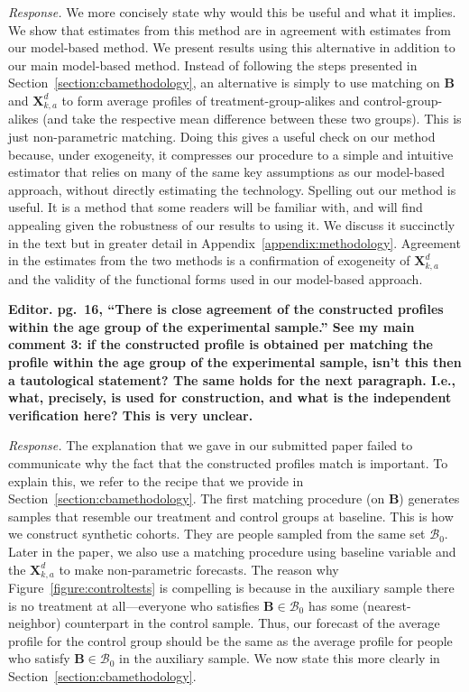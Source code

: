 \noindent \textit{Response.} We more concisely state why would this be useful and what it implies. We show that estimates from  this method are in agreement with estimates from our model-based method. We present results using this alternative in addition to our main model-based method. Instead of following the steps presented in Section~\ref{section:cbamethodology}, an alternative is simply to use matching on $\bm{B}$ and $\bm{X}^d_{k,a}$ to form average profiles of treatment-group-alikes and control-group-alikes (and take the respective mean difference between these two groups). This is just non-parametric matching. Doing this gives a useful check on our method because, under exogeneity, it compresses our procedure to a simple and intuitive estimator that relies on many of the same key assumptions as our model-based approach, without directly estimating the technology. Spelling out our method is useful. It is a method that some readers will be familiar with, and will find appealing given the robustness of our results to using it. We discuss it succinctly in the text but in greater detail in Appendix~\ref{appendix:methodology}. Agreement in the estimates from the two methods is a confirmation of exogeneity of $\bm{X}^d_{k,a}$ and the validity of the functional forms used in our model-based approach.

\noindent \textbf{Editor. pg.\ 16, ``There is close agreement of the constructed profiles within the age group of the experimental sample.'' See my main comment 3: if the constructed profile is obtained per matching the profile within the age group of the experimental sample, isn't this then a tautological statement? The same holds for the next paragraph. I.e., what, precisely, is used for construction, and what is the independent verification here? This is very unclear.}

\noindent \textit{Response.} The explanation that we gave in our submitted paper failed to communicate why the fact that the constructed profiles match is important. To explain this, we refer to the recipe that we provide in Section~\ref{section:cbamethodology}. The first matching procedure (on $\bm{B}$) generates samples that resemble our treatment and control groups at baseline. This is how we construct synthetic cohorts. They are people sampled from the same set $\mathcal{B}_0$. Later in the paper, we also use a matching procedure using baseline variable and the $\bm{X}_{k,a}^d$ to make non-parametric forecasts. The reason why Figure~\ref{figure:controltests} is compelling is because in the auxiliary sample there is no treatment at all---everyone who satisfies $\bm{B} \in \mathcal{B}_0$ has some (nearest-neighbor) counterpart in the control sample. Thus, our forecast of the average profile for the control group should be the same as the average profile for people who satisfy $\bm{B} \in \mathcal{B}_0$ in the auxiliary sample. We now state this more clearly in Section~\ref{section:cbamethodology}.

